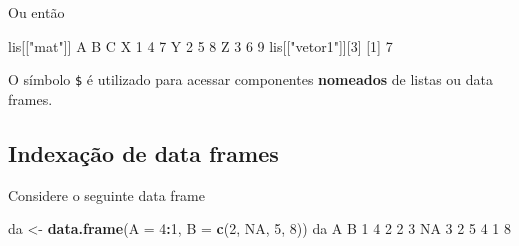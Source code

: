 \documentclass[10pt,a4paper]{book}
\newenvironment{Shaded}{\begin{snugshade}}{\end{snugshade}}
\newcommand{\KeywordTok}[1]{\textcolor[rgb]{0.13,0.29,0.53}{\textbf{#1}}}
\newcommand{\DataTypeTok}[1]{\textcolor[rgb]{0.13,0.29,0.53}{#1}}
\newcommand{\DecValTok}[1]{\textcolor[rgb]{0.00,0.00,0.81}{#1}}
\newcommand{\StringTok}[1]{\textcolor[rgb]{0.31,0.60,0.02}{#1}}
\newcommand{\OtherTok}[1]{\textcolor[rgb]{0.56,0.35,0.01}{#1}}
\newcommand{\OperatorTok}[1]{\textcolor[rgb]{0.81,0.36,0.00}{\textbf{#1}}}
\newcommand{\NormalTok}[1]{#1}
\begin{document}
\begin{Shaded}
\end{Shaded}

Ou então

\begin{Shaded}
\begin{Highlighting}[]
\NormalTok{lis[[}\StringTok{"mat"}\NormalTok{]]}
\NormalTok{  A B C}
\NormalTok{X }\DecValTok{1} \DecValTok{4} \DecValTok{7}
\NormalTok{Y }\DecValTok{2} \DecValTok{5} \DecValTok{8}
\NormalTok{Z }\DecValTok{3} \DecValTok{6} \DecValTok{9}
\NormalTok{lis[[}\StringTok{"vetor1"}\NormalTok{]][}\DecValTok{3}\NormalTok{]}
\NormalTok{[}\DecValTok{1}\NormalTok{] }\DecValTok{7}
\end{Highlighting}
\end{Shaded}

O símbolo \texttt{\$} é utilizado para acessar componentes
\textbf{nomeados} de listas ou data frames.

\subsection{Indexação de data
frames}\label{indexauxe7uxe3o-de-data-frames}

Considere o seguinte data frame

\begin{Shaded}
\begin{Highlighting}[]
\NormalTok{da <-}\StringTok{ }\KeywordTok{data.frame}\NormalTok{(}\DataTypeTok{A =} \DecValTok{4}\OperatorTok{:}\DecValTok{1}\NormalTok{, }\DataTypeTok{B =} \KeywordTok{c}\NormalTok{(}\DecValTok{2}\NormalTok{, }\OtherTok{NA}\NormalTok{, }\DecValTok{5}\NormalTok{, }\DecValTok{8}\NormalTok{))}
\NormalTok{da}
\NormalTok{  A  B}
\DecValTok{1} \DecValTok{4}  \DecValTok{2}
\DecValTok{2} \DecValTok{3} \OtherTok{NA}
\DecValTok{3} \DecValTok{2}  \DecValTok{5}
\DecValTok{4} \DecValTok{1}  \DecValTok{8}
\end{Highlighting}
\end{Shaded}
\end{document}
